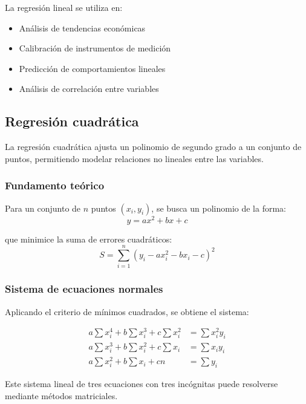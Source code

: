 \documentclass[12pt,a4paper]{article}
\begin{document}
La regresión lineal se utiliza en:
\begin{itemize}
    \item Análisis de tendencias económicas
    \item Calibración de instrumentos de medición
    \item Predicción de comportamientos lineales
    \item Análisis de correlación entre variables
\end{itemize}

\subsection{Regresión cuadrática}

La regresión cuadrática ajusta un polinomio de segundo grado a un conjunto de puntos, permitiendo modelar relaciones no lineales entre las variables.

\subsubsection{Fundamento teórico}

Para un conjunto de $n$ puntos $(x_i, y_i)$, se busca un polinomio de la forma:
\begin{equation}
    y = ax^2 + bx + c
\end{equation}

que minimice la suma de errores cuadráticos:
\begin{equation}
    S = \sum_{i=1}^{n} (y_i - ax_i^2 - bx_i - c)^2
\end{equation}

\subsubsection{Sistema de ecuaciones normales}

Aplicando el criterio de mínimos cuadrados, se obtiene el sistema:

\begin{align}
    a\sum x_i^4 + b\sum x_i^3 + c\sum x_i^2 &= \sum x_i^2 y_i \\
    a\sum x_i^3 + b\sum x_i^2 + c\sum x_i &= \sum x_i y_i \\
    a\sum x_i^2 + b\sum x_i + cn &= \sum y_i
\end{align}

Este sistema lineal de tres ecuaciones con tres incógnitas puede resolverse mediante métodos matriciales.
\end{document}
